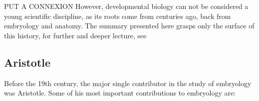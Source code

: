 %
%


PUT A CONNEXION 
However, developmental biology can not be considered a young scientific discipline, as its roots come from centuries ago, back from embryology and anatomy.
The summary presented here grasps only the surface of this history, for further and deeper lecture, see \citep{gilbert1991conceptual,amundson2005changing,hall1999evolutionary} %


\subsection{Aristotle}
Before the 19th century, the major single contributor in the study of embryology was Aristotle. 
Some of his most important contributions to embryology are:

